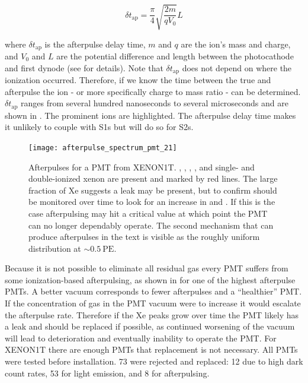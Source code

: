 \begin{equation}
\delta t_{\mathrm{ap}} = \frac{\pi}{4} \sqrt{\frac{2 m}{q V_{0}}} L
\end{equation}

\noindent where $\delta t_{\mathrm{ap}}$ is the afterpulse delay time, $m$ and $q$ are the ion's mass and charge, and $V_{0}$ and $L$ are
the potential
difference and length between the photocathode and first dynode (see  for details).  Note that $\delta t_{\mathrm{ap}}$
does not depend on where the ionization occurred.  Therefore, if we know the time between the true and afterpulse the ion - or more
specifically
charge to mass ratio - can be determined.  $\delta t_{\mathrm{ap}}$ ranges from several hundred nanoseconds to several
microseconds and are shown in .  The prominent ions are highlighted.  The afterpulse delay time makes it
unlikely to couple with S1s but will do so for S2s.

\begin{figure}
\centering
\texttt{[image: afterpulse\_spectrum\_pmt\_21]}
\caption{Afterpulses for a PMT from XENON1T.  , , , , and single- and double-ionized
xenon are present and marked by red lines.  The large fraction of Xe suggests a leak may be present, but to confirm should be monitored
over time to look for an increase in  and .  If this is the case afterpulsing may hit a critical value at which point
the PMT can no longer dependably operate.  The second mechanism that can produce afterpulses in the text is visible as the roughly uniform
distribution at ${\sim}0.5\ \mathrm{PE}$.}
\label{fig:xenon1t_pmts_ap}
\end{figure}

Because it is not possible to eliminate all residual gas every PMT suffers from some ionization-based afterpulsing, as shown in
 for one of the highest afterpulse PMTs.  A better vacuum
corresponds to fewer afterpulses and a ``healthier'' PMT.  If the concentration of gas in the PMT vacuum were to increase
it would
escalate the afterpulse rate.  Therefore if the Xe peaks grow over time the PMT likely has a leak and should
be replaced if possible, as continued worsening of the vacuum will lead to deterioration and eventually inability to operate the
PMT.  For XENON1T there are enough PMTs that replacement is not necessary.  All PMTs were tested before
installation.  73 were rejected and replaced: 12 due to high dark count rates, 53 for light emission, and 8 for
afterpulsing.

